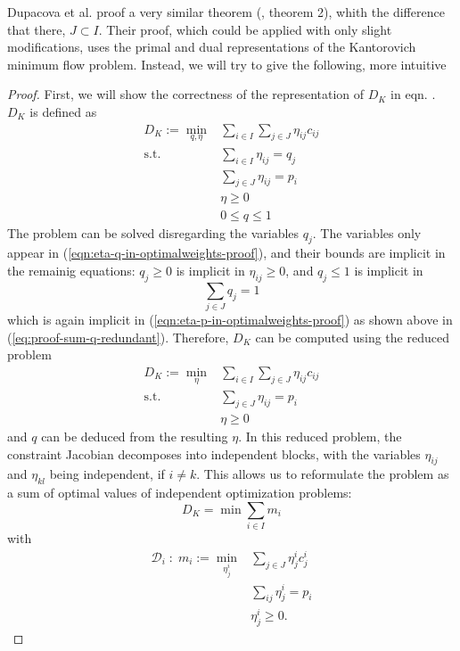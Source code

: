 Dupacova et al. proof a very similar theorem (\cite{Dupacova2003}, theorem 2), whith the difference that there, $J\subset I$. Their proof, which could be applied with only slight modifications, uses the primal and dual representations of the Kantorovich minimum flow problem. Instead, we will try to give the following, more intuitive
\begin{proof}
First, we will show the correctness of the representation of $D_K$ in eqn. \label{eq:define-Dk-optimalweights-thm}. $D_K$ is defined as
\begin{align}
  D_K := \min\limits_{q, \eta}& \sum_{i\in I}\sum_{j\in J}\eta_{ij}c_{ij}\\
  \text{s.t.}&\sum_{i\in I}\eta_{ij} = q_j\label{eqn:eta-q-in-optimalweights-proof}\\
  &\sum_{j\in J}\eta_{ij} = p_i\label{eqn:eta-p-in-optimalweights-proof}\\
  &\eta \geq 0\\
  &0 \leq q \leq 1
\end{align}
The problem can be solved disregarding the variables $q_j$. The variables only appear in (\ref{eqn:eta-q-in-optimalweights-proof}), and their bounds are implicit in the remainig equations: $q_j\geq 0$ is implicit in $\eta_{ij}\geq 0$, and $q_j\leq 1$ is implicit in 
\[\sum_{j\in J}q_j=1\]
which is again implicit in (\ref{eqn:eta-p-in-optimalweights-proof}) as shown above in  (\ref{eq:proof-sum-q-redundant}). Therefore, $D_K$ can be computed using the reduced problem
\begin{align}
  D_K := \min\limits_{\eta}& \sum_{i\in I}\sum_{j\in J}\eta_{ij}c_{ij}\\
  \text{s.t.}&\sum_{j\in J}\eta_{ij} = p_i\\
  &\eta \geq 0
\end{align}
and $q$ can be deduced from the resulting $\eta$. In this reduced problem, the constraint Jacobian decomposes into independent blocks, with the variables $\eta_{ij}$ and $\eta_{kl}$ being independent, if $i\neq k$. This allows us to reformulate the problem as a sum of optimal values of independent optimization problems:
\begin{equation}
  D_K = \min \sum_{i\in I} m_i
\end{equation}
with
\begin{align}
  \mathcal{D}_i\; :\; m_i :=\min\limits_{\eta_j^i}&\sum_{j\in J}\eta_{j}^ic_{j}^i\\
  &\sum_{ij}\eta_j^i = p_i\\
  &\eta_j^i\geq 0.
\end{align}

\end{proof}
